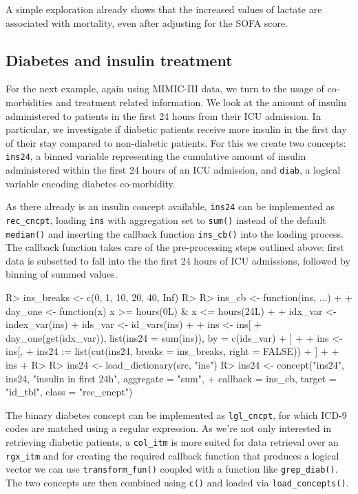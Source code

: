 \documentclass[
  notitle]{jss}
\begin{document}
A simple exploration already shows that the increased values of lactate
are associated with mortality, even after adjusting for the SOFA score.

\hypertarget{diabetes-and-insulin-treatment}{%
\subsection{Diabetes and insulin
treatment}\label{diabetes-and-insulin-treatment}}

For the next example, again using MIMIC-III data, we turn to the usage
of co-morbidities and treatment related information. We look at the
amount of insulin administered to patients in the first 24 hours from
their ICU admission. In particular, we investigate if diabetic patients
receive more insulin in the first day of their stay compared to
non-diabetic patients. For this we create two concepts: \texttt{ins24},
a binned variable representing the cumulative amount of insulin
administered within the first 24 hours of an ICU admission, and
\texttt{diab}, a logical variable encoding diabetes co-morbidity.

As there already is an insulin concept available, \texttt{ins24} can be
implemented as \texttt{rec\_cncpt}, loading \texttt{ins} with
aggregation set to \texttt{sum()} instead of the default
\texttt{median()} and inserting the callback function \texttt{ins\_cb()}
into the loading process. The callback function takes care of the
pre-processing steps outlined above: first data is subsetted to fall
into the the first 24 hours of ICU admissions, followed by binning of
summed values.

\begin{CodeChunk}
\begin{CodeInput}
R> ins_breaks <- c(0, 1, 10, 20, 40, Inf)
R> 
R> ins_cb <- function(ins, ...) {
+ 
+   day_one <- function(x) x >= hours(0L) & x <= hours(24L)
+ 
+   idx_var <- index_var(ins)
+   ids_var <- id_vars(ins)
+ 
+   ins <- ins[
+     day_one(get(idx_var)), list(ins24 = sum(ins)), by = c(ids_var)
+   ]
+ 
+   ins <- ins[,
+     ins24 := list(cut(ins24, breaks = ins_breaks, right = FALSE))
+   ]
+ 
+   ins
+ }
R> 
R> ins24 <- load_dictionary(src, "ins")
R> ins24 <- concept("ins24", ins24, "insulin in first 24h", aggregate = "sum",
+                  callback = ins_cb, target = "id_tbl", class = "rec_cncpt")
\end{CodeInput}
\end{CodeChunk}

The binary diabetes concept can be implemented as \texttt{lgl\_cncpt},
for which ICD-9 codes are matched using a regular expression. As we're
not only interested in retrieving diabetic patients, a \texttt{col\_itm}
is more suited for data retrieval over an \texttt{rgx\_itm} and for
creating the required callback function that produces a logical vector
we can use \texttt{transform\_fun()} coupled with a function like
\texttt{grep\_diab()}. The two concepts are then combined using
\texttt{c()} and loaded via \texttt{load\_concepts()}.
\end{document}
